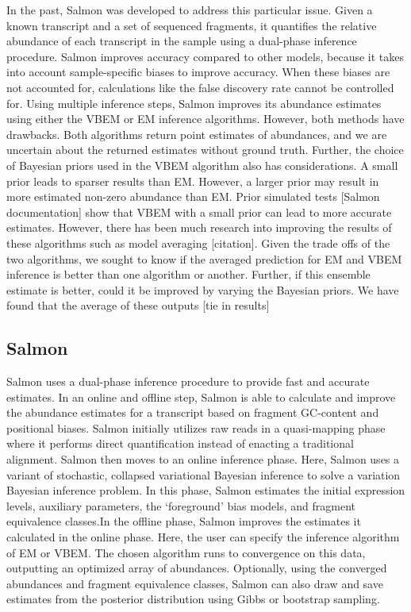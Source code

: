 In the past, Salmon was developed to address this particular issue. 
Given a known transcript and a set of sequenced fragments, it quantifies the relative abundance of each transcript in the sample using a dual-phase inference procedure. Salmon improves accuracy compared to other models, because it takes into account sample-specific biases to improve accuracy. When these biases are not accounted for, calculations like the false discovery rate cannot be controlled for. Using multiple inference steps, Salmon improves its abundance estimates using either the VBEM or EM inference algorithms. However, both methods have drawbacks. Both algorithms return point estimates of abundances, and we are uncertain about the returned estimates without ground truth. Further, the choice of  Bayesian priors used in the VBEM algorithm also has considerations. A small prior leads to sparser results than EM. However, a larger prior may result in more estimated non-zero abundance than EM. Prior simulated tests [Salmon documentation] show that VBEM with a small prior can lead to more accurate estimates. However, there has been much research into improving the results of these algorithms such as model averaging [citation]. Given the trade offs of the two algorithms, we sought to know if the averaged prediction for EM and VBEM inference is better than one algorithm or another. Further, if this ensemble estimate is better, could it be improved by varying the Bayesian priors.
We have found that the average of these outputs [tie in results]

\subsection{Salmon}
Salmon uses a dual-phase inference procedure to provide fast and accurate estimates. 
In an online and offline step, Salmon is able to calculate and improve the abundance 
estimates for a transcript based on fragment GC-content and positional biases. 
Salmon initially utilizes raw reads in a quasi-mapping phase where it performs direct 
quantification instead of enacting a traditional alignment. 
Salmon then moves to an online inference phase. 
Here, Salmon uses a variant of stochastic, collapsed variational Bayesian inference to solve 
a variation Bayesian inference problem. 
In this phase, Salmon estimates the initial expression levels, auxiliary parameters, 
the ‘foreground’ bias models, and fragment equivalence classes.In the offline phase, 
Salmon improves the estimates it calculated in the online phase. Here, the user can 
specify the inference algorithm of EM or VBEM. The chosen algorithm runs to convergence 
on this data, outputting an optimized array of abundances. 
Optionally, using the converged abundances and fragment equivalence classes, 
Salmon can also draw and save estimates from the posterior distribution using Gibbs or bootstrap sampling. 
